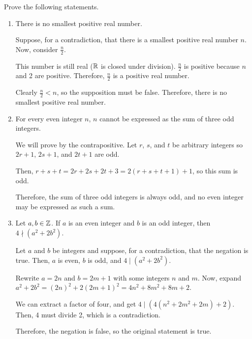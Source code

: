 \begin{recommended}
  Prove the following statements.
\end{recommended}
\begin{enumerate}
  \item There is no smallest positive real number.
        \begin{prf}
          Suppose, for a contradiction, that there is a smallest positive real number $n$.
          Now, consider $\frac{n}{2}$.

          This number is still real ($\mathbb{R}$ is closed under division).
          $\frac{n}{2}$ is positive because $n$ and 2 are positive.
          Therefore, $\frac{n}{2}$ is a positive real number.

          Clearly $\frac{n}{2} < n$, so the supposition must be false.
          Therefore, there is no smallest positive real number.
        \end{prf}

  \item For every even integer $n$, $n$ cannot be expressed as the sum of three odd integers.
        \begin{prf}
          We will prove by the contrapositive.
          Let $r$, $s$, and $t$ be arbitrary integers so $2r+1$, $2s+1$, and $2t+1$ are odd.

          Then, $r + s + t = 2r + 2s + 2t + 3 = 2(r + s + t + 1) + 1$, so this sum is odd.

          Therefore, the sum of three odd integers is always odd, and no even integer may be expressed as such a sum.
        \end{prf}

  \item Let $a,b\in\mathbb{Z}$.
        If $a$ is an even integer and $b$ is an odd integer, then $4 \nmid (a^2 + 2b^2)$.
        \begin{prf}
          Let $a$ and $b$ be integers and suppose, for a contradiction, that the negation is true.
          Then, $a$ is even, $b$ is odd, and $4 \mid (a^2 + 2b^2)$.

          Rewrite $a=2n$ and $b=2m+1$ with some integers $n$ and $m$.
          Now, expand $a^2 + 2b^2 = (2n)^2 + 2(2m+1)^2 = 4n^2 + 8m^2 + 8m + 2$.

          We can extract a factor of four, and get $4 \mid (4(n^2 + 2m^2 + 2m) + 2)$.
          Then, 4 must divide 2, which is a contradiction.

          Therefore, the negation is false, so the original statement is true.
        \end{prf}


\end{enumerate}
